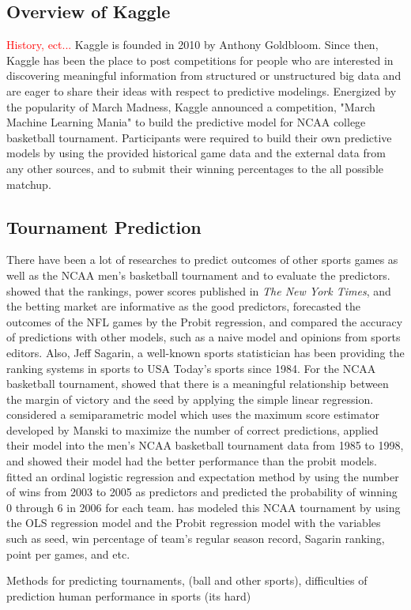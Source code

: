 \subsection{Overview of Kaggle}
\textcolor{red}{History, ect...}    
Kaggle is founded in 2010 by Anthony Goldbloom. Since then, Kaggle has been the place to post competitions for people who are interested in discovering meaningful information from structured or unstructured big data and are eager to share their ideas with respect to predictive modelings. Energized by the popularity of March Madness, Kaggle announced a competition, "March Machine Learning Mania" to build the predictive model for NCAA college basketball tournament. Participants were required to build their own predictive models by using the provided historical game data and the external data from any other sources, and to submit their winning percentages to the all possible matchup.

\subsection{Tournament Prediction}


There have been a lot of researches to predict outcomes of other sports games as well as the NCAA men's basketball tournament and to evaluate the predictors. \cite{boulier1999sports} showed that the rankings, power scores published in \emph{The New York Times}, and the betting market are informative as the good predictors, forecasted the outcomes of the NFL games by the Probit regression, and compared the accuracy of predictions with other models, such as a naive model and opinions from sports editors. Also, Jeff Sagarin, a well-known sports statistician has been providing the ranking systems in sports to USA Today's sports since 1984. For the NCAA basketball tournament, \cite{smith1999can} showed that there is a meaningful relationship between the margin of victory and the seed by applying the simple linear regression. \cite{caudill2003predicting} considered a semiparametric model which uses the maximum score estimator developed by Manski to maximize the number of correct predictions, applied their model into the men's NCAA basketball tournament data from 1985 to 1998, and showed their model had the better performance than the probit models. \cite{west2006simple} fitted an ordinal logistic regression and expectation method by using the number of wins from 2003 to 2005 as predictors and predicted the probability of winning 0 through 6 in 2006 for each team. \cite{wright2012statistical} has modeled this NCAA tournament by using the OLS regression model and the Probit regression model with the variables such as seed, win percentage of team's regular season record, Sagarin ranking, point per games, and etc. 
 

Methods for predicting tournaments, (ball and other sports), difficulties of prediction human performance in sports (its hard)
